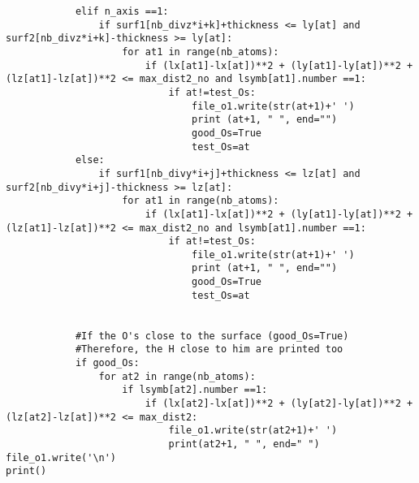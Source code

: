 \begin{lstlisting}
			elif n_axis ==1:
				if surf1[nb_divz*i+k]+thickness <= ly[at] and  surf2[nb_divz*i+k]-thickness >= ly[at]:
					for at1 in range(nb_atoms):
						if (lx[at1]-lx[at])**2 + (ly[at1]-ly[at])**2 +(lz[at1]-lz[at])**2 <= max_dist2_no and lsymb[at1].number ==1:
							if at!=test_Os:
								file_o1.write(str(at+1)+' ')
								print (at+1, " ", end="")
								good_Os=True
								test_Os=at
			else:
				if surf1[nb_divy*i+j]+thickness <= lz[at] and surf2[nb_divy*i+j]-thickness >= lz[at]:
					for at1 in range(nb_atoms):
						if (lx[at1]-lx[at])**2 + (ly[at1]-ly[at])**2 +(lz[at1]-lz[at])**2 <= max_dist2_no and lsymb[at1].number ==1:
							if at!=test_Os:
								file_o1.write(str(at+1)+' ')
								print (at+1, " ", end="")
								good_Os=True
								test_Os=at


			#If the O's close to the surface (good_Os=True)
			#Therefore, the H close to him are printed too             
			if good_Os:
				for at2 in range(nb_atoms): 
					if lsymb[at2].number ==1: 
						if (lx[at2]-lx[at])**2 + (ly[at2]-ly[at])**2 +(lz[at2]-lz[at])**2 <= max_dist2:                                                                
							file_o1.write(str(at2+1)+' ')
							print(at2+1, " ", end=" ")
file_o1.write('\n')
print()
 \end{lstlisting}
